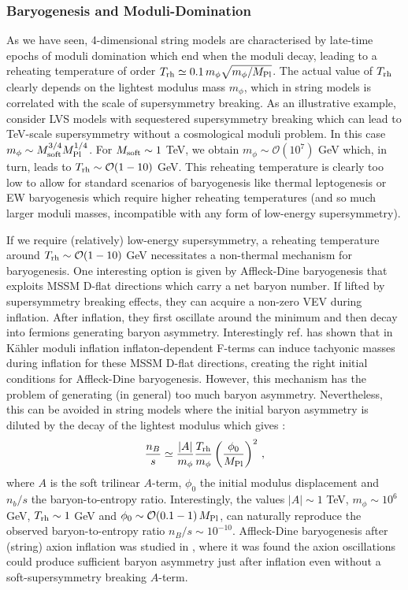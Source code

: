 \subsubsection{Baryogenesis and Moduli-Domination}

As we have seen, 4-dimensional string models are characterised by late-time epochs of moduli domination which end when the moduli decay, leading to a reheating temperature of order $T_{\rm rh}\simeq 0.1\,m_\phi\sqrt{m_\phi/M_{\rm Pl}}$. The actual value of $T_{\rm rh}$ clearly depends on the lightest modulus mass $m_\phi$, which in string models is correlated with the scale of supersymmetry breaking. As an illustrative example, consider LVS models with sequestered supersymmetry breaking which can lead to TeV-scale supersymmetry without a cosmological moduli problem. In this case $m_\phi \sim M_{\rm soft}^{3/4} M_{\rm Pl}^{1/4}$. For $M_{\rm soft}\sim 1$ TeV, we obtain $m_\phi \sim\mathcal{O}(10^7)$ GeV which, in turn, leads to $T_{\rm rh}\sim \mathcal{O}(1-10)$ GeV. This reheating temperature is clearly too low to allow for standard scenarios of baryogenesis like thermal leptogenesis or EW baryogenesis which require higher reheating temperatures (and so much larger moduli masses, incompatible with any form of low-energy supersymmetry). 

If we require (relatively) low-energy supersymmetry, a reheating temperature around $T_{\rm rh}\sim \mathcal{O}(1-10)$ GeV necessitates a non-thermal mechanism for baryogenesis. One interesting option is given by Affleck-Dine baryogenesis \cite{Affleck:1984fy} that exploits MSSM D-flat directions which carry a net baryon number. If lifted by supersymmetry breaking effects, they can acquire a non-zero VEV during inflation. After inflation, they first oscillate around the minimum and then decay into fermions generating baryon asymmetry. Interestingly ref. \cite{Allahverdi:2016yws} has shown that in K\"ahler moduli inflation inflaton-dependent F-terms can induce tachyonic masses during inflation for these MSSM D-flat directions, creating the right initial conditions for Affleck-Dine baryogenesis. However, this mechanism has the problem of generating (in general) too much baryon asymmetry. Nevertheless, this can be avoided in string models where the initial baryon asymmetry is diluted by the decay of the lightest modulus which gives \cite{Kane:2011ih}:
\begin{equation}
\frac{n_B}{s} \simeq \frac{|A|}{m_\phi}\frac{T_{\rm rh}}{m_\phi}\left(\frac{\phi_0}{M_{\rm Pl}}\right)^2\,,
\end{equation}
where $A$ is the soft trilinear $A$-term, $\phi_0$ the initial modulus displacement and $n_b/s$ the baryon-to-entropy ratio. Interestingly, the values $|A|\sim 1$ TeV, $m_\phi\sim 10^6$ GeV, $T_{\rm rh}\sim 1$ GeV and $\phi_0\sim \mathcal{O}(0.1-1)\,M_{\rm Pl}$, can naturally reproduce the observed baryon-to-entropy ratio $n_B/s\sim 10^{-10}$.  Affleck-Dine baryogenesis after (string) axion inflation was studied in \cite{Akita:2017ecc}, where it was found the axion oscillations could produce sufficient baryon asymmetry just after inflation even without a soft-supersymmetry breaking $A$-term.

